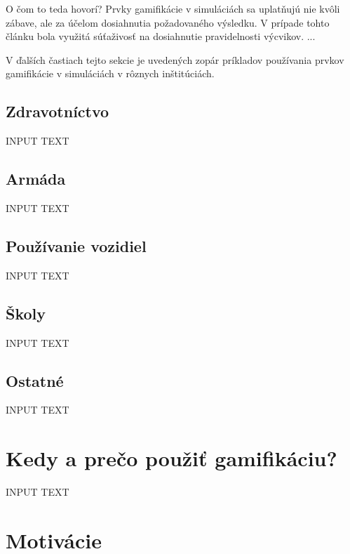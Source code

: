 \documentclass[10pt,slovak,a4paper]{article}
\begin{document}
O čom to teda hovorí? Prvky gamifikácie v simuláciách sa uplatňujú nie kvôli zábave, ale za účelom dosiahnutia požadovaného výsledku. V prípade tohto článku bola využitá súťaživosť na dosiahnutie pravidelnosti výcvikov. ...

V ďalších častiach tejto sekcie je uvedených zopár príkladov používania prvkov gamifikácie v simuláciách v rôznych inštitúciách.

\clearpage

\subsection{Zdravotníctvo} \label{healthcare}

INPUT TEXT

\subsection{Armáda} \label{army}

INPUT TEXT

\subsection{Používanie vozidiel} \label{vehicle}

INPUT TEXT

\subsection{Školy} \label{school}

INPUT TEXT

\subsection{Ostatné} \label{other}

INPUT TEXT

\section{Kedy a prečo použiť gamifikáciu?} \label{Reason}

INPUT TEXT

\section{Motivácie} \label{Motivation}
\end{document}
